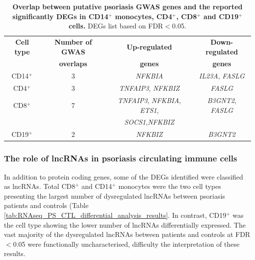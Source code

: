 \begin{table}[htbp]
\centering
\begin{tabular}{@{} c c c c}
\toprule
\textbf{Cell type}   & \textbf{Number of GWAS}   & \textbf{Up-regulated}   & \textbf{Down-regulated}  \\
										 & \textbf{overlaps}         & \textbf{genes}          &\textbf{genes} \\
\midrule
\midrule
CD14$^+$             & 3  & \textit{NFKBIA}                                   & \textit{IL23A}, \textit{FASLG}\\                 
CD4$^+$              & 3  & \textit{TNFAIP3}, \textit{NFKBIZ}                 & \textit{FASLG} \\
CD8$^+$              & 7  & \textit{TNFAIP3}, \textit{NFKBIA}, \textit{ETS1}, & \textit{B3GNT2}, \textit{FASLG} \\ 
                     &    & \textit{SOCS1},\textit{NFKBIZ}                    &  \\ 
CD19$^+$             & 2  & \textit{NFKBIZ}                                   & \textit{B3GNT2}\\
\bottomrule 
\end{tabular}
\medskip %
\caption[Overlap between putative psoriasis GWAS genes and the reported significantly DEGs in CD14$^+$ monocytes, CD4$^+$, CD8$^+$ and CD19$^+$ cells.]{\textbf{Overlap between putative psoriasis GWAS genes and the reported significantly DEGs in CD14$^+$ monocytes, CD4$^+$, CD8$^+$ and CD19$^+$ cells.} DEGs list based on FDR$<$0.05.}
\label{tab:RNAseq_PS_CTL_GWAS_overlap}
\end{table}
\bigskip %


\subsubsection{The role of lncRNAs in psoriasis circulating immune cells}
In addition to protein coding genes, some of the DEGs identified were classified as lncRNAs. Total CD8$^+$ and CD14$^+$ monocytes were the two cell types presenting the largest number of dysregulated lncRNAs between psoriasis patients and controls (Table \ref{tab:RNAseq_PS_CTL_differential_analysis_results}. In contrast, CD19$^+$ was the cell type showing the lower number of lncRNAs differentially expressed. The vast majority of the dysregulated lncRNAs between patients and controls at FDR$<$0.05 were functionally uncharacterised, difficulty the interpretation of these results. 

